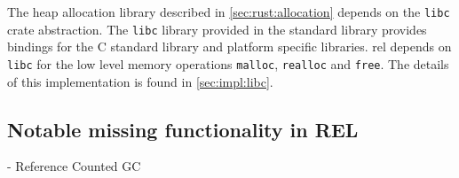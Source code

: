 The heap allocation library described in \autoref{sec:rust:allocation} depends on the \texttt{libc} crate abstraction.
The \texttt{libc} library provided in the standard library provides bindings for the C standard library and platform specific libraries.
\gls{rel} depends on \texttt{libc} for the low level memory operations \texttt{malloc}, \texttt{realloc} and \texttt{free}.
The details of this implementation is found in \autoref{sec:impl:libc}. 

\subsection{Notable missing functionality in REL}

- Reference Counted GC
